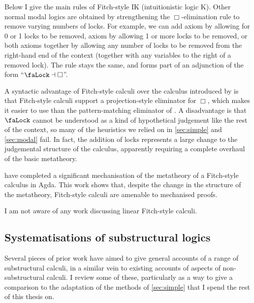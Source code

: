 Below I give the main rules of Fitch-style IK (intuitionistic logic K).
Other normal modal logics are obtained by strengthening the $\Box$-elimination
rule to remove varying numbers of locks.
For example, we can add axiom  by allowing for 0 or 1 locks to be
removed, axiom  by allowing 1 or more locks to be removed, or both
axioms together by allowing any number of locks to be removed from the
right-hand end of the context (together with any variables to the right of a
removed lock).
The  rule stays the same, and forms part of an adjunction of
the form ``$\Lock \dashv \Box$''.


A syntactic advantage of Fitch-style calculi over the calculus introduced by
\citet{judgmental} is that Fitch-style calculi support a projection-style
eliminator for $\Box$, which makes it easier to use than the pattern-matching
eliminator of \citeauthor{judgmental}.
A disadvantage is that $\Lock$ cannot be understood as a kind of hypothetical
judgement like the rest of the context, so many of the heuristics we relied on
in \cref{sec:simple} and \cref{sec:modal} fail.
In fact, the addition of locks represents a large change to the judgemental
structure of the calculus, apparently requiring a complete overhaul of the basic
metatheory.

 have completed a significant mechanisation of the metatheory of
a Fitch-style calculus in Agda.
This work shows that, despite the change in the structure of the metatheory,
Fitch-style calculi are amenable to mechanised proofs.

I am not aware of any work discussing linear Fitch-style calculi.

\subsection{Systematisations of substructural logics}\label{sec:lin-sys}

Several pieces of prior work have aimed to give general accounts of a range of
substructural calculi, in a similar vein to existing accounts of aspects of
non-substructural calculi.
I review some of these, particularly as a way to give a comparison to the
adaptation of the methods of \cref{sec:simple} that I spend the rest of this
thesis on.

